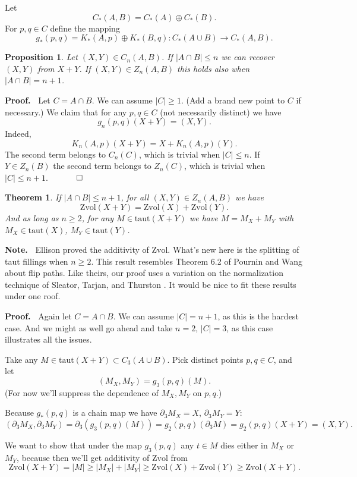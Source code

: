 \documentclass[12pt]{article}
\newtheorem{theorem}{Theorem}
\newtheorem{prop}{Proposition}
\newcommand{\proofstart}{{\noindent \bf Proof.\ }}
\newcommand{\note}{{\noindent \bf Note.\ }}
\newcommand{\proofend}{$\quad \qed$}
\def\del{\partial}
\newcommand{\union}{\cup}
\newcommand{\kw}{\mathrm}
\newcommand{\taut}{\kw{taut}}
\newcommand{\Zvol}{\kw{Zvol}}
\newcommand{\direct}{\oplus}
\begin{document}
Let
\[
C_*(A,B) = C_*(A) \direct C_*(B)
.
\]
For $p,q \in C$ define the mapping
\[
g_*(p,q) = K_*(A,p) \direct K_*(B,q):
C_*(A \cup B) \to C_*(A,B)
.
\]

\begin{prop} \label{recover}
Let $(X,Y) \in C_n(A,B)$.
If $|A \cap B| \leq n$
we can recover $(X,Y)$ from $X+Y$.
If $(X,Y) \in Z_n(A,B)$ this holds also when $|A \cap B|  = n+1$.
\end{prop}

\proofstart
Let $C=A \cap B$.
We can assume $|C| \geq 1$.
(Add a brand new point to $C$ if necessary.)
We claim that
for any $p,q \in C$
(not necessarily distinct) we have
\[
g_n(p,q)(X+Y)=(X,Y)
.
\]
Indeed,
\[
K_n(A,p)(X+Y) = X + K_n(A,p)(Y)
.
\]
The second term belongs to $C_n(C)$,
which is trivial when $|C| \leq n$.
If $Y \in Z_n(B)$ the second term belongs to $Z_n(C)$,
which is trivial when $|C| \leq n+1$.
\proofend


\begin{theorem} \label{th1}
If $|A \cap B| \leq n+1$,
for all $(X,Y) \in Z_n(A,B)$ we have
\[
\Zvol(X+Y) = \Zvol(X)+\Zvol(Y)
.
\]
And as long as $n \geq 2$,
for any $M \in \taut(X+Y)$ 
we have $M = M_X + M_Y$
with $M_X \in \taut(X)$, $M_Y \in \taut(Y)$.
\end{theorem}

\note
Ellison \cite{ellison:gap}
proved the additivity of $\Zvol$.
What's new here is the splitting of taut fillings when $n\geq 2$.
This result resembles Theorem 6.2 of
Pournin and Wang
\cite{pw:flip}
about flip paths.
Like theirs, our proof uses a variation on the normalization technique
of Sleator, Tarjan, and Thurston
\cite[Lemma 7]{stt:jams}.
It would be nice to fit these results under one roof.
\medskip

\proofstart
Again let $C = A \cap B$.
We can assume $|C| = n+1$,
as this is the hardest case.
And we might as well go ahead and take $n=2$, $|C|=3$,
as this case illustrates all the issues.

Take any $M \in \taut(X+Y) \subset C_3(A \union B)$.
Pick distinct points $p,q \in C$,
and let
\[
(M_X,M_Y) = g_{3}(p,q)(M)
.
\]
(For now we'll suppress the dependence of $M_X,M_Y$ on $p,q$.)

Because $g_*(p,q)$ is a chain map we have
$\del_{3} M_X = X$, $\del_{3} M_Y = Y$:
\[
(\del_{3} M_X, \del_{3} M_Y)
=
\del_{3} (g_{3}(p,q)(M))
=
g_2(p, q)(\del_{3} M)
=
g_2(p,q)(X+Y)
=
(X,Y)
.
\]

We want to show that under the map $g_3(p,q)$ any $t \in M$
dies either in $M_X$ or $M_Y$,
because then we'll get additivity of $\Zvol$ from
\[
\Zvol(X+Y) = |M|
\geq |M_X| + |M_Y|
\geq \Zvol(X) + \Zvol(Y)
\geq \Zvol(X+Y)
.
\]
\end{document}
